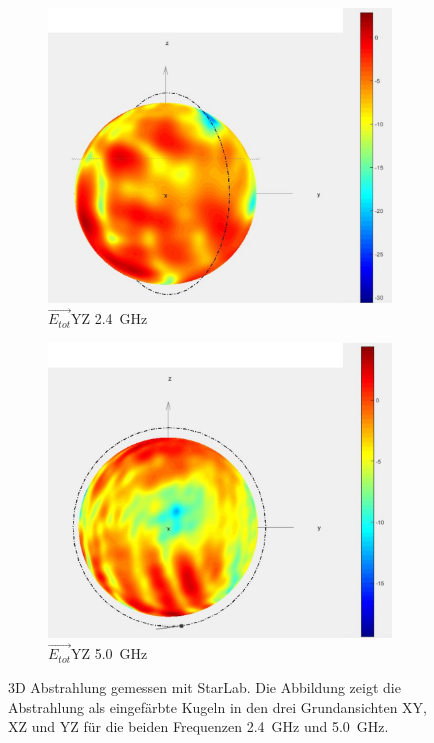 \begin{figure}[h!]
	\begin{subfigure}[t]{0.35\textwidth}
		\begin{center}
			\includegraphics[width=1\textwidth]{../fig/plt/star_lab_2ghz4_yz_reduced.png}
			\caption{$\vec{E_{tot}}$YZ \SI{2.4}{\giga\hertz}}
		\end{center}
	\end{subfigure}
	\begin{subfigure}[t]{0.35\textwidth}
		\begin{center}
			\includegraphics[width=1\textwidth]{../fig/plt/star_lab_5ghz0_yz_reduced.png}
			\caption{$\vec{E_{tot}}$YZ \SI{5.0}{\giga\hertz}}
		\end{center}
	\end{subfigure}
	\caption[3D Abstrahlung gemessen mit StarLab]{
		3D Abstrahlung gemessen mit StarLab. Die Abbildung
		zeigt die Abstrahlung als eingefärbte Kugeln in den
		drei Grundansichten XY, XZ und YZ für die beiden
		Frequenzen \SI{2.4}{\giga\hertz} und
		\SI{5.0}{\giga\hertz}.}
\end{figure}

